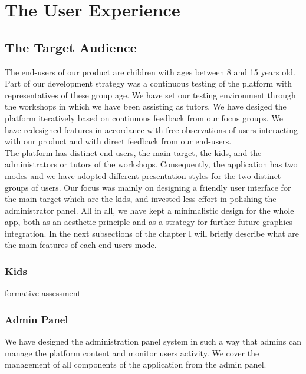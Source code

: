 
\chapter{The User Experience}


\section{The Target Audience}

The end-users of our product are children with ages between 8 and 15 years old. Part of our development strategy was a continuous testing of the platform with representatives of these group age. We have set our testing environment through the workshops in which we have been assisting as tutors. 
We have desiged the platform iteratively based on continuous feedback from our focus groups. We have redesigned features in accordance with free observations of users interacting with our product and with direct feedback from our end-users. \\

The platform has distinct end-users, the main target, the kids, and the administrators or tutors of the workshops. Consequently, the application has two modes and we have adopted different presentation styles for the two distinct groups of users. Our focus was mainly on designing a friendly user interface for the main target which are the kids, and invested less effort in polishing the administrator panel. 
All in all, we have kept a minimalistic design for the whole app, both as an aesthetic principle and as a strategy for further future graphics integration.
In the next subsections of the chapter I will briefly describe what are the main features of each end-users mode.

\subsection{Kids}
formative assessment
\subsection{Admin Panel}

We have designed the administration panel system in such a way that admins can manage the platform content and monitor users activity. We cover the management of all components of the application from the admin panel. \\

